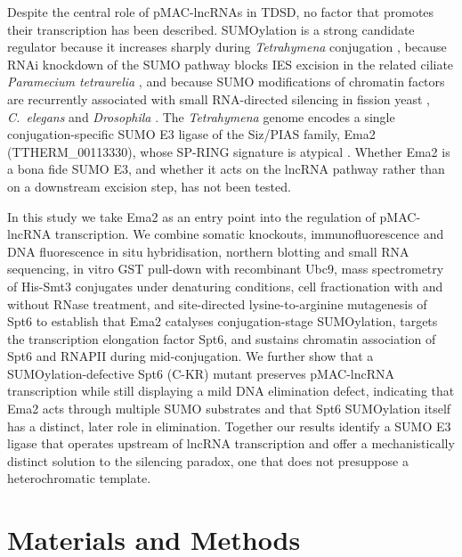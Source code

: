 \documentclass[11pt]{article}
\begin{document}
Despite the central role of pMAC-lncRNAs in TDSD, no factor that promotes
their transcription has been described. SUMOylation is a strong candidate
regulator because it increases sharply during \emph{Tetrahymena}
conjugation \citep{nasir2015sumo}, because RNAi knockdown of the SUMO
pathway blocks IES excision in the related ciliate \emph{Paramecium
tetraurelia} \citep{matsuda2006sumo}, and because SUMO modifications of
chromatin factors are recurrently associated with small RNA-directed
silencing in fission yeast \citep{shin2005sumo}, \emph{C.~elegans}
\citep{kim2021hdac1} and \emph{Drosophila} \citep{ninova2019suvar}.
The \emph{Tetrahymena} genome encodes a single conjugation-specific SUMO
E3 ligase of the Siz/PIAS family, Ema2 (TTHERM\_00113330), whose SP-RING
signature is atypical \citep{hochstrasser2001spring}. Whether Ema2 is a
bona fide SUMO E3, and whether it acts on the lncRNA pathway rather than
on a downstream excision step, has not been tested.

In this study we take Ema2 as an entry point into the regulation of
pMAC-lncRNA transcription. We combine somatic knockouts, immunofluorescence
and DNA fluorescence in situ hybridisation, northern blotting and small
RNA sequencing, in vitro GST pull-down with recombinant Ubc9, mass
spectrometry of His-Smt3 conjugates under denaturing conditions, cell
fractionation with and without RNase treatment, and site-directed
lysine-to-arginine mutagenesis of Spt6 to establish that Ema2 catalyses
conjugation-stage SUMOylation, targets the transcription elongation factor
Spt6, and sustains chromatin association of Spt6 and RNAPII during
mid-conjugation. We further show that a SUMOylation-defective Spt6
(C-KR) mutant preserves pMAC-lncRNA transcription while still displaying
a mild DNA elimination defect, indicating that Ema2 acts through multiple
SUMO substrates and that Spt6 SUMOylation itself has a distinct, later
role in elimination. Together our results identify a SUMO E3 ligase that
operates upstream of lncRNA transcription and offer a mechanistically
distinct solution to the silencing paradox, one that does not presuppose
a heterochromatic template.

\section{Materials and Methods}
\end{document}

